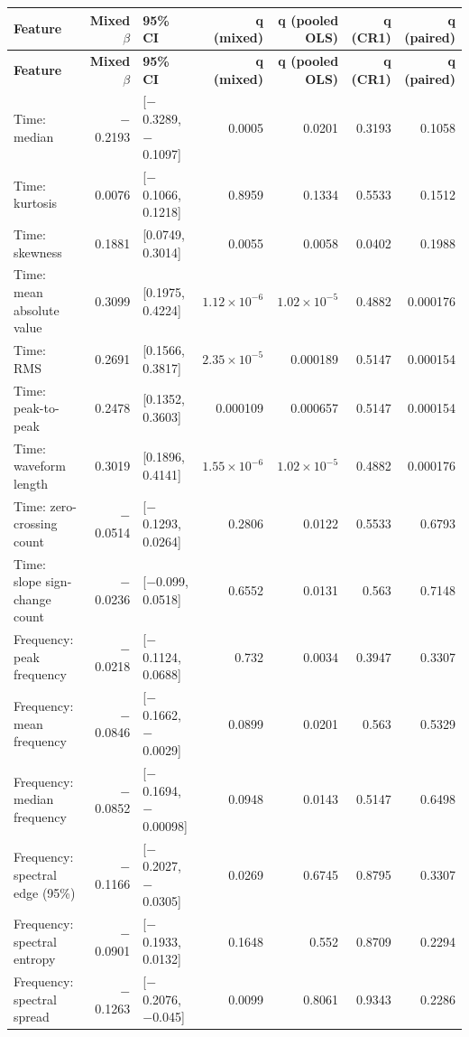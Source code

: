 \documentclass[10pt]{article}
\begin{document}
\begin{longtable}{p{5.2cm}rp{3.4cm}rrrr}
\toprule
\textbf{Feature} & \textbf{Mixed $\beta$} & \textbf{95\% CI} & \textbf{q (mixed)} & \textbf{q (pooled OLS)} & \textbf{q (CR1)} & \textbf{q (paired)} \\
\midrule
\endfirsthead
\toprule
\textbf{Feature} & \textbf{Mixed $\beta$} & \textbf{95\% CI} & \textbf{q (mixed)} & \textbf{q (pooled OLS)} & \textbf{q (CR1)} & \textbf{q (paired)} \\
\midrule
\endhead
Time: median & $-$0.2193 & [$-$0.3289, $-$0.1097] & 0.0005 & 0.0201 & 0.3193 & 0.1058 \\
Time: kurtosis & 0.0076 & [$-$0.1066, 0.1218] & 0.8959 & 0.1334 & 0.5533 & 0.1512 \\
Time: skewness & 0.1881 & [0.0749, 0.3014] & 0.0055 & 0.0058 & 0.0402 & 0.1988 \\
Time: mean absolute value & 0.3099 & [0.1975, 0.4224] & $1.12\times10^{-6}$ & $1.02\times10^{-5}$ & 0.4882 & 0.000176 \\
Time: RMS & 0.2691 & [0.1566, 0.3817] & $2.35\times10^{-5}$ & 0.000189 & 0.5147 & 0.000154 \\
Time: peak-to-peak & 0.2478 & [0.1352, 0.3603] & 0.000109 & 0.000657 & 0.5147 & 0.000154 \\
Time: waveform length & 0.3019 & [0.1896, 0.4141] & $1.55\times10^{-6}$ & $1.02\times10^{-5}$ & 0.4882 & 0.000176 \\
Time: zero-crossing count & $-$0.0514 & [$-$0.1293, 0.0264] & 0.2806 & 0.0122 & 0.5533 & 0.6793 \\
Time: slope sign-change count & $-$0.0236 & [$-$0.099, 0.0518] & 0.6552 & 0.0131 & 0.563 & 0.7148 \\
Frequency: peak frequency & $-$0.0218 & [$-$0.1124, 0.0688] & 0.732 & 0.0034 & 0.3947 & 0.3307 \\
Frequency: mean frequency & $-$0.0846 & [$-$0.1662, $-$0.0029] & 0.0899 & 0.0201 & 0.563 & 0.5329 \\
Frequency: median frequency & $-$0.0852 & [$-$0.1694, $-$0.00098] & 0.0948 & 0.0143 & 0.5147 & 0.6498 \\
Frequency: spectral edge (95\%) & $-$0.1166 & [$-$0.2027, $-$0.0305] & 0.0269 & 0.6745 & 0.8795 & 0.3307 \\
Frequency: spectral entropy & $-$0.0901 & [$-$0.1933, 0.0132] & 0.1648 & 0.552 & 0.8709 & 0.2294 \\
Frequency: spectral spread & $-$0.1263 & [$-$0.2076, $-$0.045] & 0.0099 & 0.8061 & 0.9343 & 0.2286 \\

\end{longtable}
\end{document}

